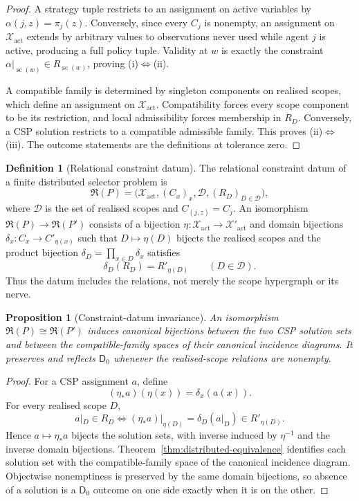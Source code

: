 \documentclass[11pt]{article}
\theoremstyle{plain}
\newtheorem{proposition}[theorem]{Proposition}
\theoremstyle{definition}
\newtheorem{definition}[theorem]{Definition}
\theoremstyle{remark}
\begin{document}
\begin{proof}
A strategy tuple restricts to an assignment on active variables by
$\alpha(j,z)=\pi_j(z)$. Conversely, since every $C_j$ is nonempty, an assignment
on $\mathcal X_{\mathrm{act}}$ extends by arbitrary values to observations never
used while agent $j$ is active, producing a full policy tuple. Validity at $w$
is exactly the constraint
$\alpha|_{\operatorname{sc}(w)}\in R_{\operatorname{sc}(w)}$, proving
(i)$\Leftrightarrow$(ii).

A compatible family is determined by singleton components on realised scopes,
which define an assignment on $\mathcal X_{\mathrm{act}}$. Compatibility forces
every scope component to be its restriction, and local admissibility forces
membership in $R_D$. Conversely, a CSP solution restricts to a compatible
admissible family. This proves (ii)$\Leftrightarrow$(iii). The outcome statements
are the definitions at tolerance zero.
\end{proof}


\begin{definition}[Relational constraint datum]\label{def:constraint-datum}
The relational constraint datum of a finite distributed selector problem is
\[
\mathfrak R(P)=
\bigl(\mathcal X_{\mathrm{act}},(C_x)_x,
\mathcal D,(R_D)_{D\in\mathcal D}\bigr),
\]
where $\mathcal D$ is the set of realised scopes and $C_{(j,z)}=C_j$.
An isomorphism $\mathfrak R(P)\to\mathfrak R(P')$ consists of a bijection
$\eta:\mathcal X_{\mathrm{act}}\to\mathcal X'_{\mathrm{act}}$ and domain
bijections $\delta_x:C_x\to C'_{\eta(x)}$ such that
$D\mapsto\eta(D)$ bijects the realised scopes and the product bijection
$\delta_D=\prod_{x\in D}\delta_x$ satisfies
\[
\delta_D(R_D)=R'_{\eta(D)}
\qquad(D\in\mathcal D).
\]
Thus the datum includes the relations, not merely the scope hypergraph or its
nerve.
\end{definition}

\begin{proposition}[Constraint-datum invariance]\label{prop:constraint-invariance}
An isomorphism $\mathfrak R(P)\cong\mathfrak R(P')$ induces canonical
bijections between the two CSP solution sets and between the compatible-family
spaces of their canonical incidence diagrams. It preserves and reflects
$\mathsf D_0$ whenever the realised-scope relations are nonempty.
\end{proposition}

\begin{proof}
For a CSP assignment $a$, define
\[
(\eta_*a)(\eta(x))=\delta_x(a(x)).
\]
For every realised scope $D$,
\[
a|_D\in R_D
\iff
(\eta_*a)|_{\eta(D)}=\delta_D(a|_D)\in R'_{\eta(D)}.
\]
Hence $a\mapsto\eta_*a$ bijects the solution sets, with inverse induced by
$\eta^{-1}$ and the inverse domain bijections. Theorem~\ref{thm:distributed-equivalence}
identifies each solution set with the compatible-family space of the canonical
incidence diagram. Objectwise nonemptiness is preserved by the same domain
bijections, so absence of a solution is a $\mathsf D_0$ outcome on one side
exactly when it is on the other.
\end{proof}
\end{document}
